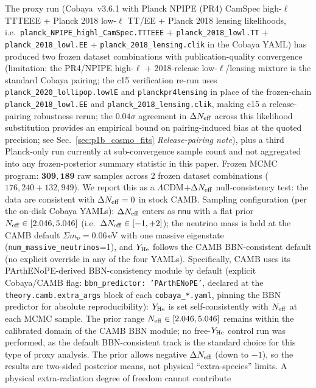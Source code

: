 \documentclass[aps,prd,twocolumn,superscriptaddress,showpacs,preprintnumbers,nofootinbib,longbibliography,floatfix]{revtex4-2}
\newcommand{\Neff}{N_{\rm eff}}
\begin{document}
The proxy run (Cobaya~v3.6.1 with Planck NPIPE (PR4) CamSpec high-$\ell$
TTTEEE + Planck 2018 low-$\ell$ TT/EE + Planck 2018 lensing likelihoods,
i.e.\ \texttt{planck\_NPIPE\_highl\_CamSpec.TTTEEE} +
\texttt{planck\_2018\_lowl.TT} + \texttt{planck\_2018\_lowl.EE} +
\texttt{planck\_2018\_lensing.clik} in the Cobaya YAML)
has produced two frozen dataset combinations with publication-quality
convergence (limitation: the PR4/NPIPE high-$\ell$ + 2018-release
low-$\ell$/lensing mixture is the standard Cobaya pairing; the c15
verification re-run uses \texttt{planck\_2020\_lollipop.lowlE} and
\texttt{planckpr4lensing} in place of the frozen-chain
\texttt{planck\_2018\_lowl.EE} and \texttt{planck\_2018\_lensing.clik},
making c15 a release-pairing robustness rerun; the $0.04\sigma$ agreement
in $\Delta\Neff$ across this likelihood substitution provides an empirical
bound on pairing-induced bias at the quoted precision; see
Sec.~\ref{sec:p1b_cosmo_fits} \emph{Release-pairing note}), plus a third Planck-only run currently at sub-convergence
sample count and not aggregated into any frozen-posterior summary statistic
in this paper. Frozen MCMC program: $\mathbf{309{,}189}$ raw samples
across 2 frozen dataset combinations ($176{,}240 + 132{,}949$).
We report this as a $\Lambda$CDM$+\Delta\Neff$ null-consistency test: the data
are consistent with $\Delta\Neff=0$ in stock CAMB.
Sampling configuration (per the on-disk Cobaya YAMLs): $\Delta\Neff$ enters
as \texttt{nnu} with a flat prior $\Neff\in[2.046, 5.046]$
(i.e.\ $\Delta\Neff\in[-1,+2]$); the neutrino mass is held at the CAMB
default $\Sigma m_\nu = 0.06$\,eV with one massive eigenstate
(\texttt{num\_massive\_neutrinos}=1), and $Y_{\rm He}$ follows the CAMB
BBN-consistent default (no explicit override in any of the four YAMLs).
Specifically, CAMB uses its PArthENoPE-derived BBN-consistency module
by default (explicit Cobaya/CAMB flag: \texttt{bbn\_predictor:
'PArthENoPE'}, declared at the \texttt{theory.camb.extra\_args}
block of each \texttt{cobaya\_*.yaml}, pinning the BBN predictor for
absolute reproducibility): $Y_{\rm He}$ is set self-consistently with
$\Neff$ at each MCMC sample. The prior range $\Neff\in[2.046, 5.046]$ remains within the
calibrated domain of the CAMB BBN module; no free-$Y_{\rm He}$ control run
was performed, as the default BBN-consistent track is the standard choice
for this type of proxy analysis.
The prior allows negative $\Delta\Neff$ (down to $-1$), so the results are
two-sided posterior means, not physical ``extra-species'' limits.
A physical extra-radiation degree of freedom cannot contribute
\end{document}
